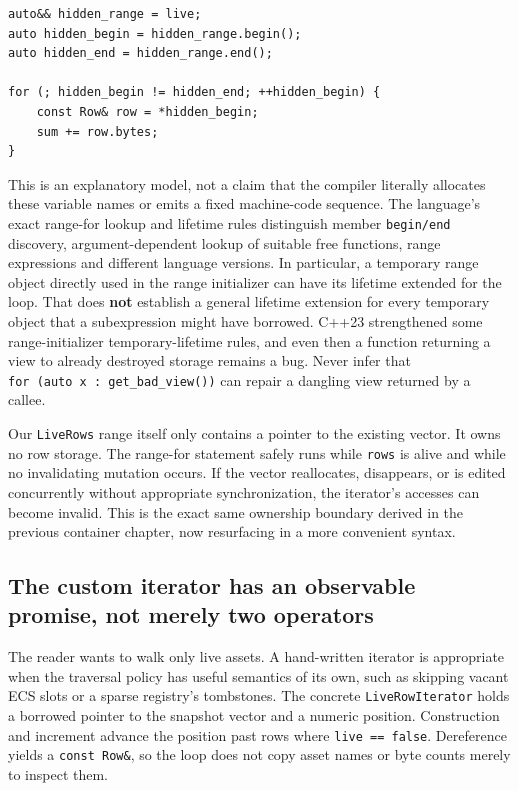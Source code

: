 \begin{verbatim}
auto&& hidden_range = live;
auto hidden_begin = hidden_range.begin();
auto hidden_end = hidden_range.end();

for (; hidden_begin != hidden_end; ++hidden_begin) {
    const Row& row = *hidden_begin;
    sum += row.bytes;
}
\end{verbatim}

This is an explanatory model, not a claim that the compiler literally allocates these variable names or emits a fixed machine-code sequence. The language's exact range-for lookup and lifetime rules distinguish member \texttt{begin/end} discovery, argument-dependent lookup of suitable free functions, range expressions and different language versions. In particular, a temporary range object directly used in the range initializer can have its lifetime extended for the loop. That does \textbf{not} establish a general lifetime extension for every temporary object that a subexpression might have borrowed. C++23 strengthened some range-initializer temporary-lifetime rules, and even then a function returning a view to already destroyed storage remains a bug. Never infer that \texttt{for\ (auto\ x\ :\ get\_bad\_view())} can repair a dangling view returned by a callee.

Our \texttt{LiveRows} range itself only contains a pointer to the existing vector. It owns no row storage. The range-for statement safely runs while \texttt{rows} is alive and while no invalidating mutation occurs. If the vector reallocates, disappears, or is edited concurrently without appropriate synchronization, the iterator's accesses can become invalid. This is the exact same ownership boundary derived in the previous container chapter, now resurfacing in a more convenient syntax.

\subsection{The custom iterator has an observable promise, not merely two operators}\label{01-foundations-i-ch006-the-custom-iterator-has-an-observable-promise-not-merely-two-operators}

The reader wants to walk only live assets. A hand-written iterator is appropriate when the traversal policy has useful semantics of its own, such as skipping vacant ECS slots or a sparse registry's tombstones. The concrete \texttt{LiveRowIterator} holds a borrowed pointer to the snapshot vector and a numeric position. Construction and increment advance the position past rows where \texttt{live\ ==\ false}. Dereference yields a \texttt{const\ Row\&}, so the loop does not copy asset names or byte counts merely to inspect them.

